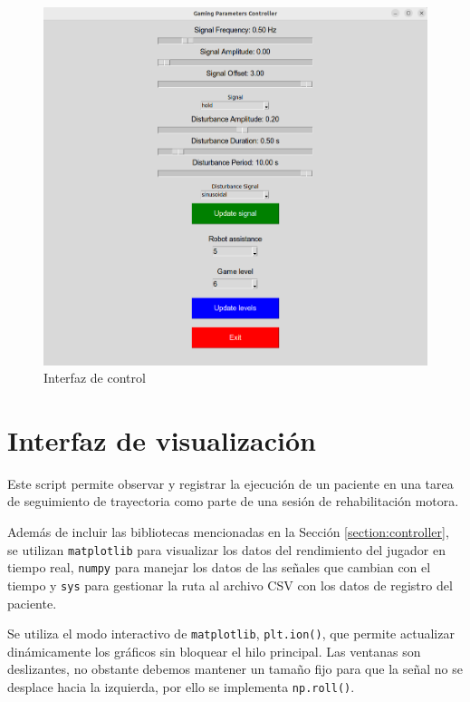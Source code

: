 \begin{figure}[ht!]
	\centering
	\begin{minipage}{0.85\linewidth}
		\centering
		\includegraphics[width=\linewidth]{figs/control_pannel.png}
	\end{minipage}
	\caption[Interfaz de control]{Interfaz de control}
	\label{fig:control}
\end{figure}

\section{Interfaz de visualización}

Este script permite observar y registrar la ejecución de un paciente en una tarea de seguimiento de trayectoria como parte de una sesión de rehabilitación motora.

Además de incluir las bibliotecas mencionadas en la Sección \ref{section:controller}, se utilizan \verb|matplotlib| para visualizar los datos del rendimiento del jugador en tiempo real, \verb|numpy| para manejar los datos de las señales que cambian con el tiempo y \verb|sys| para gestionar la ruta al archivo CSV con los datos de registro del paciente.

Se utiliza el modo interactivo de \verb|matplotlib|, \verb|plt.ion()|, que permite actualizar dinámicamente los gráficos sin bloquear el hilo principal.
Las ventanas son deslizantes, no obstante debemos mantener un tamaño fijo para que la señal no se desplace hacia la izquierda, por ello se implementa \verb|np.roll()|.

